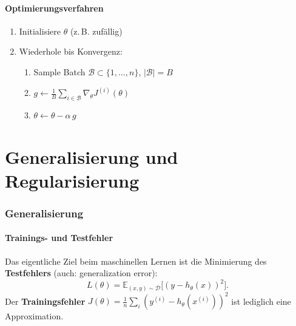 \documentclass[11pt]{article}
\theoremstyle{csthm}
\theoremstyle{csdef}
\newcommand{\E}{\mathbb{E}}
\begin{document}
\subsection{Optimierungsverfahren}

\begin{tcolorbox}[algostyle, title={Mini-Batch SGD}]
\begin{enumerate}[leftmargin=*, itemsep=1pt]
  \item Initialisiere $\theta$ (z.\,B. zufällig)
  \item Wiederhole bis Konvergenz:
    \begin{enumerate}[label=(\alph*)]
      \item Sample Batch $\mathcal{B} \subset \{1,\ldots,n\}$, $|\mathcal{B}| = B$
      \item $g \leftarrow \frac{1}{B}\sum_{i \in \mathcal{B}} \nabla_\theta J^{(i)}(\theta)$
      \item $\theta \leftarrow \theta - \alpha\, g$
    \end{enumerate}
\end{enumerate}
\end{tcolorbox}

\newpage
\part{Generalisierung und Regularisierung}

\section{Generalisierung}

\subsection{Trainings- und Testfehler}

Das eigentliche Ziel beim maschinellen Lernen ist die Minimierung des
\textbf{Testfehlers} (auch: generalization error):
\begin{equation}
  L(\theta) = \E_{(x,y) \sim \mathcal{D}}\bigl[(y - h_\theta(x))^2\bigr].
\end{equation}
Der \textbf{Trainingsfehler} $J(\theta) = \frac{1}{n}\sum_i (y^{(i)} -
h_\theta(x^{(i)}))^2$ ist lediglich eine Approximation.
\end{document}
